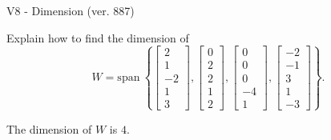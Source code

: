 \begin{exercise}
  \begin{exerciseTitle}V8 - Dimension (ver. 887)\end{exerciseTitle}
  \begin{exerciseStatement}
    Explain how to find the dimension of 
\[W=\mathrm{span}\ \left\{\left[\begin{array}{r}
2 \\
1 \\
-2 \\
1 \\
3
\end{array}\right] , \left[\begin{array}{r}
0 \\
2 \\
2 \\
1 \\
2
\end{array}\right] , \left[\begin{array}{r}
0 \\
0 \\
0 \\
-4 \\
1
\end{array}\right] , \left[\begin{array}{r}
-2 \\
-1 \\
3 \\
1 \\
-3
\end{array}\right]\right\}.\]



  \end{exerciseStatement}
  \begin{exerciseAnswer}
   The dimension of \(W\) is  \(4\).
  


  \end{exerciseAnswer}
\end{exercise}
